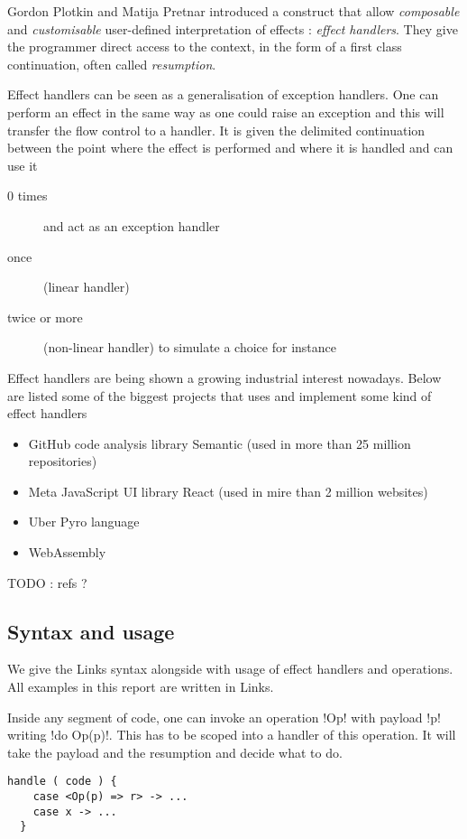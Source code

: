 \documentclass[11pt, nonacm=true, language=french, language=english]{acmart}
\begin{document}
Gordon Plotkin and Matija Pretnar \citep{plotkin-pretnar} introduced a construct that allow \emph{composable} and \emph{customisable} user-defined interpretation of effects : \emph{effect handlers}. They give the programmer direct access to the context, in the form of a first class continuation, often called \emph{resumption}.

Effect handlers can be seen as a generalisation of exception handlers. One can perform an effect in the same way as one could raise an exception and this will transfer the flow control to a handler. It is given the delimited continuation between the point where the effect is performed and where it is handled and can use it
\begin{description}
  \item[0 times] and act as an exception handler
  \item[once] (linear handler)
  \item[twice or more] (non-linear handler) to simulate a choice for instance
\end{description}

Effect handlers are being shown a growing industrial interest nowadays. Below are listed some of the biggest projects that uses and implement some kind of effect handlers
\begin{itemize}
  \item GitHub code analysis library Semantic (used in more than 25 million repositories)
  \item Meta JavaScript UI library React (used in mire than 2 million websites)
  \item Uber Pyro language
  \item WebAssembly
\end{itemize}

TODO : refs ?

\subsection{Syntax and usage}

We give the Links syntax alongside with usage of effect handlers and operations. All examples in this report are written in Links.

Inside any segment of code, one can invoke an operation !Op! with payload !p! writing !do Op(p)!. This has to be scoped into a handler of this operation. It will take the payload and the resumption and decide what to do.

\begin{lstlisting}[caption=Handler,label=lst:handler]
  handle ( code ) {
    case <Op(p) => r> -> ...
    case x -> ...
  }
\end{lstlisting}
\end{document}
